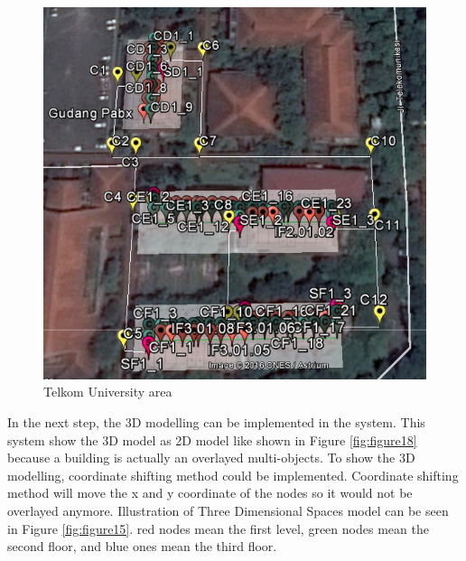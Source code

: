 \begin{figure}[h!]
	\centering
	\includegraphics[scale=1]{figure19b.png}
	\caption{Telkom University area}
	\label{fig:figure19b}
\end{figure}



In the next step, the 3D modelling can be implemented in the system. This system show the 3D model as 2D model like shown in Figure \ref{fig:figure18} because a building is actually an overlayed multi-objects. To show the 3D modelling, coordinate shifting method could be implemented. Coordinate shifting method will move the x and y coordinate of the nodes so it would not be overlayed anymore. Illustration of Three Dimensional Spaces model can be seen in Figure \ref{fig:figure15}. red nodes mean the first level, green nodes mean the second floor, and blue ones mean the third floor.

